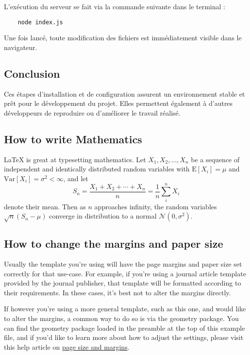 \documentclass{article}
\begin{document}
L'exécution du serveur se fait via la commande suivante dans le terminal :
\begin{verbatim}
    node index.js
\end{verbatim}

Une fois lancé, toute modification des fichiers est immédiatement visible dans le navigateur.

\subsection{Conclusion}

Ces étapes d'installation et de configuration assurent un environnement stable et prêt pour le développement du projet. Elles permettent également à d'autres développeurs de reproduire ou d'améliorer le travail réalisé.








\subsection{How to write Mathematics}

\LaTeX{} is great at typesetting mathematics. Let $X_1, X_2, \ldots, X_n$ be a sequence of independent and identically distributed random variables with $\text{E}[X_i] = \mu$ and $\text{Var}[X_i] = \sigma^2 < \infty$, and let
\[S_n = \frac{X_1 + X_2 + \cdots + X_n}{n}
      = \frac{1}{n}\sum_{i}^{n} X_i\]
denote their mean. Then as $n$ approaches infinity, the random variables $\sqrt{n}(S_n - \mu)$ converge in distribution to a normal $\mathcal{N}(0, \sigma^2)$.


\subsection{How to change the margins and paper size}

Usually the template you're using will have the page margins and paper size set correctly for that use-case. For example, if you're using a journal article template provided by the journal publisher, that template will be formatted according to their requirements. In these cases, it's best not to alter the margins directly.

If however you're using a more general template, such as this one, and would like to alter the margins, a common way to do so is via the geometry package. You can find the geometry package loaded in the preamble at the top of this example file, and if you'd like to learn more about how to adjust the settings, please visit this help article on \href{https://www.overleaf.com/learn/latex/page_size_and_margins}{page size and margins}.
\end{document}
